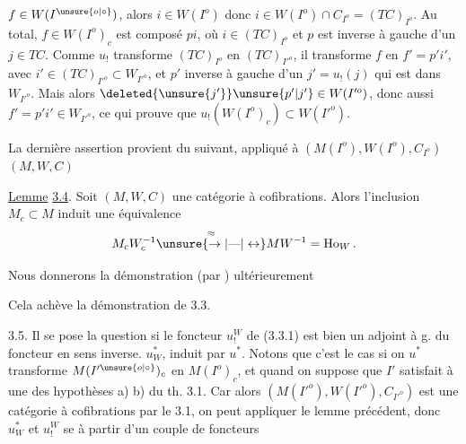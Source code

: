 
$f\in W(I^{\unsure{o|\circ}})$, alors $i\in W(I^o)$ donc $i\in W(I^o)\cap C_{I^o}=(TC)_{I^o}$.
Au total,  $f\in W(I^o)_c$ est composé $pi$,
où $i\in(TC)_{I^o}$ et $p$ est inverse à gauche
d'un $j\in TC$. Comme $u_!$ transforme
$(TC)_{I^o}$ en $(TC)_{I'^o}$, il transforme $f$
en $f'=p'i'$, avec $i'\in(TC)_{I'^o}\subset W_{I'^o}$,
et $p'$ inverse à gauche d'un $j'=u_!(j)$
qui est  dans $W_{I'^o}$. Mais alors
$\deleted{\unsure{j'}}\unsure{p'|j'}\in W(I'^o)$, donc aussi $f'=p'i'\in W_{I'^o}$,
ce qui prouve que $u_!(W(I^o)_c)\subset W(I'^o)$.

La dernière assertion provient du 
suivant, appliqué à $(M(I^o),W(I^o),C_{I^o})$  $(M,W,C)$

\uline{Lemme} \uline{3.4}. Soit $(M,W,C)$ une catégorie
à cofibrations. Alors l'inclusion $M_c\subset M$
induit une équivalence 
\[
M_c W_c^{-1}\overset{\approx}{\unsure{\to|\text{---}|\leftrightarrow}}MW^{-1}=\mathrm{Ho}_W\,.
\]

Nous donnerons la démonstration (par
) ultérieurement

Cela achève la démonstration de
3.3.

3.5. Il se pose la question si  le foncteur
$u_!^W$ de (3.3.1) est bien un adjoint à g.
du foncteur en sens inverse. $u_W^*$, induit
par $u^*$. Notons que c'est le cas si on
 $u^*$ transforme $M(I'^{\unsure{o|\circ}})_c$ en
$M(I^o)_c$, et quand on suppose que
$I'$  satisfait  à une des hypothèses
a) b) du th. 3.1. Car alors $(M(I'^o),W(I'^o),C_{I'^o})$
est une catégorie à cofibrations par le 
3.1, on peut  appliquer le lemme
précédent, donc $u_W^*$ et $u_!^W$ se  à
partir d'un couple de foncteurs


